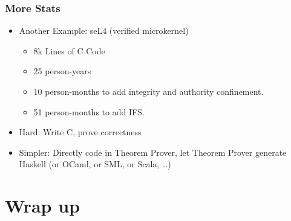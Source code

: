 \documentclass[aspectratio=169]{beamer}
\begin{document}
\begin{frame}
	\frametitle{More Stats}
	\begin{itemize}
		\item Another Example: seL4 (verified microkernel)
		\begin{itemize}
			\item 8k Lines of C Code
			\item 25 person-years
			\item<2-> 10 person-months to add integrity and authority confinement.
			\item<2-> 51 person-months to add IFS.
		\end{itemize}
		\item<3-> Hard: Write C, prove correctness
		\item<4-> Simpler: Directly code in Theorem Prover, let Theorem Prover generate Haskell (or OCaml, or SML, or Scala, \dots)
	\end{itemize}
\end{frame}


\section{Wrap up}
\end{document}
